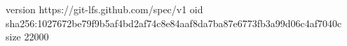 version https://git-lfs.github.com/spec/v1
oid sha256:1027672be79f9b5af4bd2af74c8e84aaf8da7ba87e6773fb3a99d06c4af7040c
size 22000
